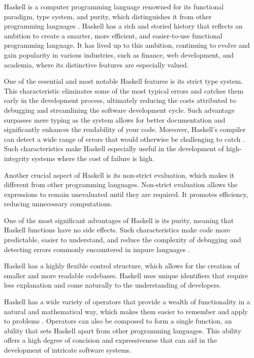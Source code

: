 \documentclass[a4paper, titlepage, twoside]{article}
\begin{document}
Haskell is a computer programming language renowned for its functional paradigm, type system, and purity, which distinguishes it from other programming languages \autocite{marlowParallelConcurrentProgramming2013}. Haskell has a rich and storied history that reflects an ambition to create a smarter, more efficient, and easier-to-use functional programming language. It has lived up to this ambition, continuing to evolve and gain popularity in various industries, such as finance, web development, and academia, where its distinctive features are especially valued.

One of the essential and most notable Haskell features is its strict type system. This characteristic eliminates some of the most typical errors and catches them early in the development process, ultimately reducing the costs attributed to debugging and streamlining the software development cycle. Such advantage surpasses mere typing as the system allows for better documentation and significantly enhances the readability of your code. Moreover, Haskell's compiler can detect a wide range of errors that would otherwise be challenging to catch \autocite{huttonProgrammingHaskell2007}. Such characteristics make Haskell especially useful in the development of high-integrity systems where the cost of failure is high.

Another crucial aspect of Haskell is its non-strict evaluation, which makes it different from other programming languages. Non-strict evaluation allows the expressions to remain unevaluated until they are required. It promotes efficiency, reducing unnecessary computations.

One of the most significant advantages of Haskell is its purity, meaning that Haskell functions have no side effects. Such characteristics make code more predictable, easier to understand, and reduce the complexity of debugging and detecting errors commonly encountered in impure languages \autocite{huttonProgrammingHaskell2007}.

Haskell has a highly flexible control structure, which allows for the creation of smaller and more readable codebases. Haskell uses unique identifiers that require less explanation and come naturally to the understanding of developers.

Haskell has a wide variety of operators that provide a wealth of functionality in a natural and mathematical way, which makes them easier to remember and apply to problems \autocite{huttonProgrammingHaskell2007}. Operators can also be composed to form a single function, an ability that sets Haskell apart from other programming languages. This ability offers a high degree of concision and expressiveness that can aid in the development of intricate software systems.
\end{document}
